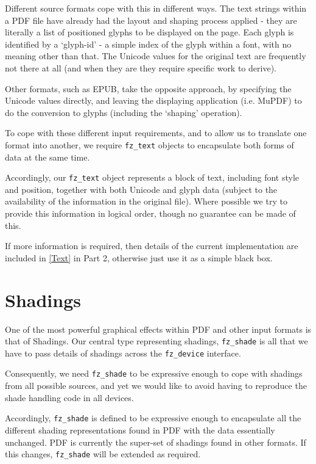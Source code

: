 \documentclass[oneside]{book}
\newcommand{\rjwref}[1] {\autoref{#1} \nameref{#1}}
\begin{document}
Different source formats cope with this in different ways. The text strings within a PDF file have already had the layout and shaping process applied - they are literally a list of positioned glyphs to be displayed on the page. Each glyph is identified by a `glyph-id' - a simple index of the glyph within a font, with no meaning other than that. The Unicode values for the original text are frequently not there at all (and when they are they require specific work to derive).

Other formats, such as EPUB, take the opposite approach, by specifying the Unicode values directly, and leaving the displaying application (i.e. MuPDF) to do the conversion to glyphs (including the `shaping' operation).

To cope with these different input requirements, and to allow us to translate one format into another, we require \texttt{fz\_text} objects to encapsulate both forms of data at the same time.

Accordingly, our \texttt{fz\_text} object represents a block of text, including font style and position, together with both Unicode and glyph data (subject to the availability of the information in the original file). Where possible we try to provide this information in logical order, though no guarantee can be made of this.

If more information is required, then details of the current implementation are included in \rjwref{Text} in Part 2, otherwise just use it as a simple black box.

\section{Shadings}
\label{ShadingsOverview}

One of the most powerful graphical effects within PDF and other input formats is that of Shadings. Our central type representing shadings, \texttt{fz\_shade} is all that we have to pass details of shadings across the \texttt{fz\_device} interface.

Consequently, we need \texttt{fz\_shade} to be expressive enough to cope with shadings from all possible sources, and yet we would like to avoid having to reproduce the shade handling code in all devices.

Accordingly, \texttt{fz\_shade} is defined to be expressive enough to encapsulate all the different shading representations found in PDF with the data essentially unchanged. PDF is currently the super-set of shadings found in other formats. If this changes, \texttt{fz\_shade} will be extended as required.
\end{document}
